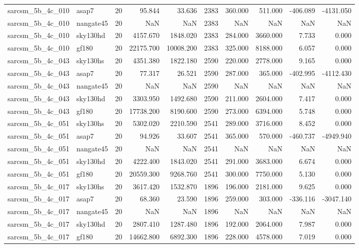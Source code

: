 \begin{tabular}{llrrrrrrrr}
sarcsm\_5b\_4c\_010 & asap7 & 20 & 95.844 & 33.636 & 2383 & 360.000 & 511.000 & -406.089 & -4131.050 \\
sarcsm\_5b\_4c\_010 & nangate45 & 20 & NaN & NaN & 2383 & NaN & NaN & NaN & NaN \\
sarcsm\_5b\_4c\_010 & sky130hd & 20 & 4157.670 & 1848.020 & 2383 & 284.000 & 3660.000 & 7.733 & 0.000 \\
sarcsm\_5b\_4c\_010 & gf180 & 20 & 22175.700 & 10008.200 & 2383 & 325.000 & 8188.000 & 6.057 & 0.000 \\
sarcsm\_5b\_4c\_043 & sky130hs & 20 & 4351.380 & 1822.180 & 2590 & 220.000 & 2778.000 & 9.165 & 0.000 \\
sarcsm\_5b\_4c\_043 & asap7 & 20 & 77.317 & 26.521 & 2590 & 287.000 & 365.000 & -402.995 & -4112.430 \\
sarcsm\_5b\_4c\_043 & nangate45 & 20 & NaN & NaN & 2590 & NaN & NaN & NaN & NaN \\
sarcsm\_5b\_4c\_043 & sky130hd & 20 & 3303.950 & 1492.680 & 2590 & 211.000 & 2604.000 & 7.417 & 0.000 \\
sarcsm\_5b\_4c\_043 & gf180 & 20 & 17738.200 & 8190.600 & 2590 & 273.000 & 6394.000 & 5.748 & 0.000 \\
sarcsm\_5b\_4c\_051 & sky130hs & 20 & 5302.020 & 2210.590 & 2541 & 289.000 & 3716.000 & 8.452 & 0.000 \\
sarcsm\_5b\_4c\_051 & asap7 & 20 & 94.926 & 33.607 & 2541 & 365.000 & 570.000 & -460.737 & -4949.940 \\
sarcsm\_5b\_4c\_051 & nangate45 & 20 & NaN & NaN & 2541 & NaN & NaN & NaN & NaN \\
sarcsm\_5b\_4c\_051 & sky130hd & 20 & 4222.400 & 1843.020 & 2541 & 291.000 & 3683.000 & 6.674 & 0.000 \\
sarcsm\_5b\_4c\_051 & gf180 & 20 & 20559.300 & 9268.760 & 2541 & 300.000 & 7750.000 & 5.130 & 0.000 \\
sarcsm\_5b\_4c\_017 & sky130hs & 20 & 3617.420 & 1532.870 & 1896 & 196.000 & 2181.000 & 9.625 & 0.000 \\
sarcsm\_5b\_4c\_017 & asap7 & 20 & 68.360 & 23.590 & 1896 & 259.000 & 303.000 & -336.116 & -3047.140 \\
sarcsm\_5b\_4c\_017 & nangate45 & 20 & NaN & NaN & 1896 & NaN & NaN & NaN & NaN \\
sarcsm\_5b\_4c\_017 & sky130hd & 20 & 2807.410 & 1287.480 & 1896 & 192.000 & 2064.000 & 7.987 & 0.000 \\
sarcsm\_5b\_4c\_017 & gf180 & 20 & 14662.800 & 6892.300 & 1896 & 228.000 & 4578.000 & 7.019 & 0.000 \\

\end{tabular}
